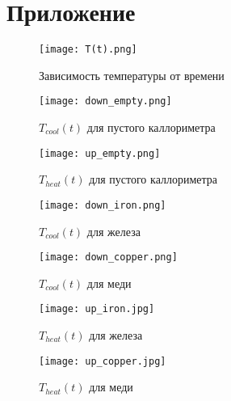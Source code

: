 \documentclass[a4paper,11pt]{extarticle}
\begin{document}










\newpage
\section*{Приложение}

\begin{figure}
    \centering
    \texttt{[image: T(t).png]}
    \label{fig:Tt}
    \caption{Зависимость температуры от времени}
\end{figure}
\begin{figure}
    \centering
    \texttt{[image: down\_empty.png]}
    \label{fig:d_empty}
    \caption{$T_{cool}(t)$ для пустого каллориметра}
\end{figure}
\begin{figure}
    \centering
    \texttt{[image: up\_empty.png]}
    \label{fig:u_empty}
    \caption{$T_{heat}(t)$ для пустого каллориметра}
\end{figure}
\begin{figure}
    \centering
    \texttt{[image: down\_iron.png]}
    \label{fig:d_iron}
    \caption{$T_{cool}(t)$ для железа}
\end{figure}
\begin{figure}
    \centering
    \texttt{[image: down\_copper.png]}
    \label{fig:d_copper}
    \caption{$T_{cool}(t)$ для меди}
\end{figure}
\begin{figure}
    \centering
    \texttt{[image: up\_iron.jpg]}
    \label{fig:u_iron}
    \caption{$T_{heat}(t)$ для железа}
\end{figure}
\begin{figure}
    \centering
    \texttt{[image: up\_copper.jpg]}
    \label{fig:u_copper}
    \caption{$T_{heat}(t)$ для меди}
\end{figure}

\end{document}
